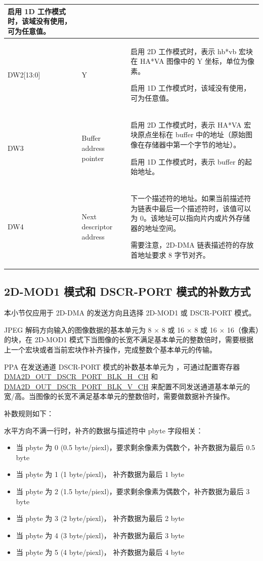 \documentclass[main\_\_CN.tex]{subfiles}
\begin{document}
\begin{longtable}[c]{|m{1.8cm}|m{2.5cm}|L{10.2cm}|}
    启用 1D 工作模式时，该域没有使用，可为任意值。\\\hline
DW2[13:0] & Y & 启用 2D 工作模式时，表示 hb*vb 宏块在 HA*VA 图像中的 Y 坐标，单位为像素。

    启用 1D 工作模式时，该域没有使用，可为任意值。\\\hline

DW3 & Buffer address pointer & 启用 2D 工作模式时，表示 HA*VA 宏块原点坐标在 buffer 中的地址（原始图像在存储器中第一个字节的地址）。

    启用 1D 工作模式时，表示 buffer 的起始地址。\\\hline

DW4 & Next descriptor address & 下一个描述符的地址。如果当前描述符为链表中最后一个描述符时，该值可以为 0。该地址可以指向片内或片外存储器的地址空间。
    \begin{tiplisting}
        需要注意，2D-DMA 链表描述符的存放首地址要求 8 字节对齐。
    \end{tiplisting}
    \\\hline
\end{longtable}


\subsection{2D-MOD1 模式和 DSCR-PORT 模式的补数方式}

本小节仅应用于 2D-DMA 的发送方向且选择 2D-MOD1 或 DSCR-PORT 模式。

JPEG 解码方向输入的图像数据的基本单元为 8 $\times$ 8 或 16 $\times$ 8 或 16 $\times$ 16（像素）的块，在 2D-MOD1 模式下当图像的长宽不满足基本单元的整数倍时，需要根据上一个宏块或者当前宏块作补齐操作，完成整数个基本单元的传输。

PPA 在发送通道 DSCR-PORT 模式的补数基本单元为 ，可通过配置寄存器 \hyperref[fielddesc:DMA2DOUTDSCRPORTBLKHCHN]{DMA2D\_OUT\_DSCR\_PORT\_BLK\_H\_CH} 和 \hyperref[fielddesc:DMA2DOUTDSCRPORTBLKVCHN]{DMA2D\_OUT\_DSCR\_PORT\_BLK\_V\_CH} 来配置不同发送通道基本单元的宽/高。当图像的长宽不满足基本单元的整数倍时，需要做数据补齐操作。

补数规则如下：

水平方向不满一行时，补齐的数据与描述符中 pbyte 字段相关：
\begin{itemize}
    \item 当 pbyte 为 0 (0.5 byte/piexl)，要求剩余像素为偶数个，补齐数据为最后 0.5 byte
    \item 当 pbyte 为 1 (1 byte/piexl)， 补齐数据为最后 1 byte
    \item 当 pbyte 为 2 (1.5 byte/piexl)，要求剩余像素为偶数个，补齐数据为最后 3 byte
    \item 当 pbyte 为 3 (2 byte/piexl)， 补齐数据为最后 2 byte
    \item 当 pbyte 为 4 (3 byte/piexl)， 补齐数据为最后 3 byte
    \item 当 pbyte 为 5 (4 byte/piexl)， 补齐数据为最后 4 byte
\end{itemize}
\end{document}
